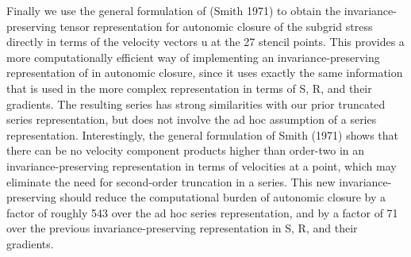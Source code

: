 Finally we use the general formulation of (Smith 1971) to obtain the invariance-preserving tensor representation for autonomic closure of the subgrid stress   directly in terms of the velocity vectors u at the 27 stencil points. This provides a more computationally efficient way of implementing an invariance-preserving representation of   in autonomic closure, since it uses exactly the same information that is used in the more complex representation in terms of S, R, and their gradients.  The resulting series has strong similarities with our prior truncated series representation, but does not involve the ad hoc assumption of a series representation. Interestingly, the general formulation of Smith (1971) shows that there can be no velocity component products higher than order-two in an invariance-preserving representation in terms of velocities at a point, which may eliminate the need for second-order truncation in a series. This new invariance-preserving should reduce the computational burden of autonomic closure by a factor of roughly 543 over the ad hoc series representation, and by a factor of 71 over the previous invariance-preserving representation in S, R, and their gradients.
